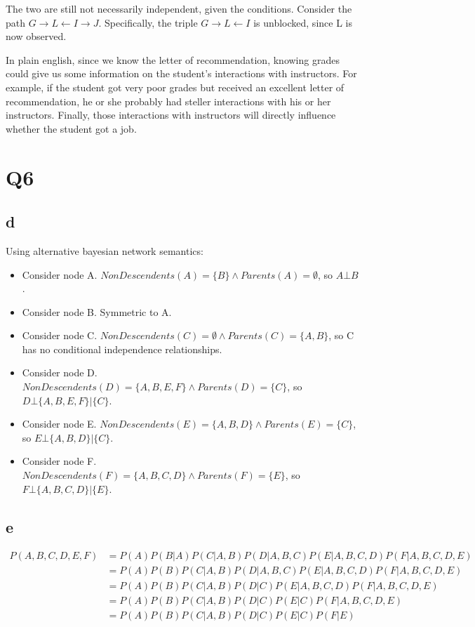 \documentclass{article}
\begin{document}
The two are still not necessarily independent, given the conditions. Consider the 
path $ G \rightarrow L \leftarrow I \rightarrow J $. Specifically, the triple 
$ G \rightarrow L \leftarrow I $ is unblocked, since L is now observed.

In plain english, since we know the letter of recommendation, knowing grades could 
give us some information on the student's interactions with instructors. For example, 
if the student got very poor grades but received an excellent letter of recommendation, 
he or she probably had steller interactions with his or her instructors. Finally, 
those interactions with instructors will directly influence whether the student 
got a job.

\section{Q6}

\subsection{d}

Using alternative bayesian network semantics:

\begin{itemize}
    \item Consider node A. $NonDescendents(A) = \{B\} \wedge Parents(A) = \emptyset$, so $ A \bot B $.
    \item Consider node B. Symmetric to A.
    \item Consider node C. $NonDescendents(C) = \emptyset \wedge Parents(C) = \{A, B\}$, so C has no conditional independence relationships.
    \item Consider node D. $NonDescendents(D) = \{A, B, E, F\} \wedge Parents(D) = \{C\}$, so $D \bot \{A, B, E, F\} | \{C\}$.
    \item Consider node E. $NonDescendents(E) = \{A, B, D\} \wedge Parents(E) = \{C\}$, so $E \bot \{A, B, D\} | \{C\}$.
    \item Consider node F. $NonDescendents(F) = \{A, B, C, D\} \wedge Parents(F) = \{E\}$, so $F \bot \{A, B, C, D\} | \{E\}$.
\end{itemize}

\subsection{e}

\begin{align*}
P(A, B, C, D, E, F) &= P(A) P(B | A) P(C | A, B) P(D | A, B, C) P(E | A, B, C, D) P(F | A, B, C, D, E) \\
                    &= P(A) P(B) P(C | A, B) P(D | A, B, C) P(E | A, B, C, D) P(F | A, B, C, D, E) \\
                    &= P(A) P(B) P(C | A, B) P(D | C) P(E | A, B, C, D) P(F | A, B, C, D, E) \\
                    &= P(A) P(B) P(C | A, B) P(D | C) P(E | C) P(F | A, B, C, D, E) \\
                    &= P(A) P(B) P(C | A, B) P(D | C) P(E | C) P(F | E)
\end{align*}
\end{document}
